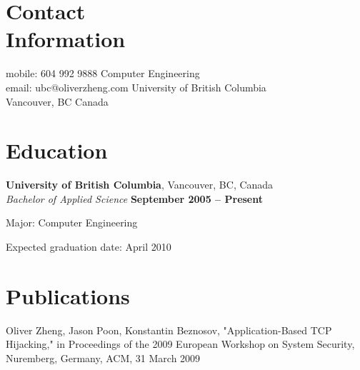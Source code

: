 \documentclass[margin,line]{resume}
\begin{document}
\begin{resume}

    \section{\mysidestyle Contact\\Information}

    mobile: 604 992 9888       \hfill Computer Engineering\vspace{0mm}\\\vspace{0mm}%
    email: ubc@oliverzheng.com \hfill University of British Columbia\vspace{0mm}\\\vspace{0mm}%
                               \hfill Vancouver, BC Canada

    \section{\mysidestyle Education}

    \textbf{University of British Columbia}, Vancouver, BC, Canada
        \vspace{2mm}\\\vspace{1mm}%
    \textsl{Bachelor of Applied Science} \hfill \textbf{September 2005 -- Present}
        \vspace{-3mm}\\\vspace{-1mm}%
    \begin{list2}
        \item Major: Computer Engineering
        \item Expected graduation date: April 2010
    \end{list2}
    \vspace{-1.5mm}

    \section{\mysidestyle Publications}
    Oliver Zheng, Jason Poon, Konstantin Beznosov, "Application-Based TCP Hijacking," in Proceedings of the 2009 European Workshop on System Security, Nuremberg, Germany, ACM, 31 March 2009


\end{resume}
\end{document}
